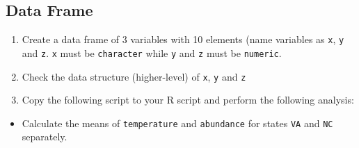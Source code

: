 \documentclass[
]{book}
\providecommand{\tightlist}{%
  \setlength{\itemsep}{0pt}\setlength{\parskip}{0pt}}
\begin{document}
\hypertarget{data-frame-1}{%
\subsection{Data Frame}\label{data-frame-1}}

\begin{enumerate}
\def\labelenumi{\alph{enumi}.}
\tightlist
\item
  Create a data frame of 3 variables with 10 elements (name variables as \texttt{x}, \texttt{y} and \texttt{z}. \texttt{x} must be \texttt{character} while \texttt{y} and \texttt{z} must be \texttt{numeric}.
\item
  Check the data structure (higher-level) of \texttt{x}, \texttt{y} and \texttt{z}
\item
  Copy the following script to your R script and perform the following analysis:
\end{enumerate}

\begin{itemize}
\tightlist
\item
  Calculate the means of \texttt{temperature} and \texttt{abundance} for states \texttt{VA} and \texttt{NC} separately.
\end{itemize}
\end{document}
